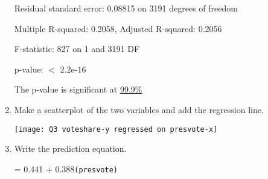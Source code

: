 \documentclass[12pt,letterpaper]{article}
\begin{document}
\begin{enumerate}
		Residual standard error: 0.08815 on 3191 degrees of freedom
		
		Multiple R-squared: 0.2058, Adjusted R-squared: 0.2056 
		
		F-statistic: 827 on 1 and 3191 DF
		
		p-value: $<$ 2.2e-16
		
		The p-value is significant at \underline{99.9\%}
		\vspace{1cm}
		\item Make a scatterplot of the two variables and add the regression line. 
		
		\texttt{[image: Q3 voteshare-y regressed on presvote-x]}
		\item Write the prediction equation.
		
		\-\hspace{0.5cm} = 0.441 + 0.388\texttt{(presvote)}
	\end{enumerate}
	
	
	\newpage	
\end{document}
